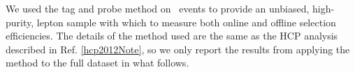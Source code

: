  
We used the tag and probe method on \dyll~events to provide an unbiased, high-purity, 
lepton sample with which to measure both online and offline selection efficiencies.
The details of the method used are the same as the HCP analysis described
in Ref. \ref{hcp2012Note}, so we only report the results from 
applying the method to the full dataset in what follows.

